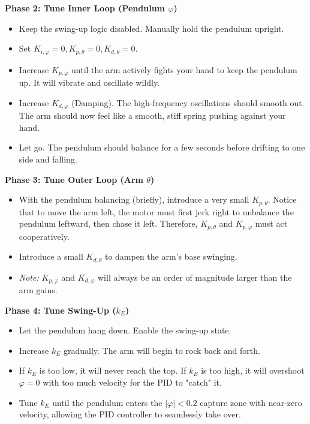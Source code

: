 \documentclass[12pt]{article}
\begin{document}
\textbf{Phase 2: Tune Inner Loop (Pendulum $\varphi$)}
\begin{itemize}
    \item Keep the swing-up logic disabled. Manually hold the pendulum upright.
    \item Set $K_{i,\varphi} = 0, K_{p,\theta} = 0, K_{d,\theta} = 0$. 
    \item Increase $K_{p,\varphi}$ until the arm actively fights your hand to keep the pendulum up. It will vibrate and oscillate wildly.
    \item Increase $K_{d,\varphi}$ (Damping). The high-frequency oscillations should smooth out. The arm should now feel like a smooth, stiff spring pushing against your hand.
    \item Let go. The pendulum should balance for a few seconds before drifting to one side and falling.
\end{itemize}

\textbf{Phase 3: Tune Outer Loop (Arm $\theta$)}
\begin{itemize}
    \item With the pendulum balancing (briefly), introduce a very small $K_{p,\theta}$. Notice that to move the arm left, the motor must first jerk right to unbalance the pendulum leftward, then chase it left. Therefore, $K_{p,\theta}$ and $K_{p,\varphi}$ must act cooperatively. 
    \item Introduce a small $K_{d,\theta}$ to dampen the arm's base swinging. 
    \item \textit{Note:} $K_{p,\varphi}$ and $K_{d,\varphi}$ will always be an order of magnitude larger than the arm gains.
\end{itemize}

\textbf{Phase 4: Tune Swing-Up ($k_E$)}
\begin{itemize}
    \item Let the pendulum hang down. Enable the swing-up state.
    \item Increase $k_E$ gradually. The arm will begin to rock back and forth. 
    \item If $k_E$ is too low, it will never reach the top. If $k_E$ is too high, it will overshoot $\varphi = 0$ with too much velocity for the PID to "catch" it.
    \item Tune $k_E$ until the pendulum enters the $|\varphi| < 0.2$ capture zone with near-zero velocity, allowing the PID controller to seamlessly take over.
\end{itemize}



\end{document}
